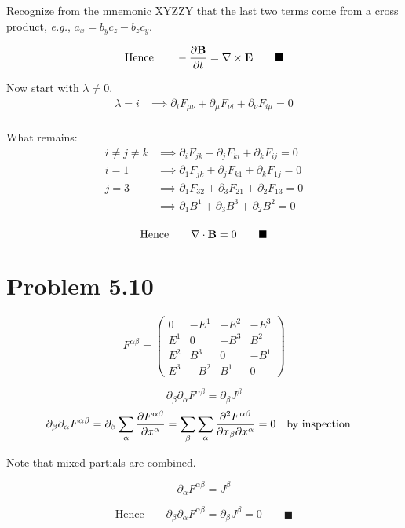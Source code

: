 \documentclass{article}
\begin{document}
Recognize from the mnemonic XYZZY that the last two terms come from a cross product, \emph{e.g.}, $a_x=b_y c_z-b_z c_y$.

 \[\text{Hence}\qquad
-\frac{\partial \vb{B}}{\partial t}= \vb{\nabla} \times \vb{E} 
 \qquad\blacksquare\]

Now start with $\lambda\ne 0$.
\begin{align*} 
\lambda=i&\implies\partial_i F_{\mu \nu} + \partial_\mu F_{\nu i} + \partial_\nu F_{i \mu} = 0 \\
\end{align*}

What remains:
\begin{align*} 
i\ne j\ne k&\implies\partial_i F_{j k} + \partial_j F_{k i} + \partial_k F_{i j} = 0 \\
i=1&\implies\partial_1 F_{j k} + \partial_j F_{k 1} + \partial_k F_{1 j} = 0 \\
j=3&\implies\partial_1 F_{3 2} + \partial_3 F_{2 1} + \partial_2 F_{1 3} = 0 \\
&\implies\partial_1 B^1 + \partial_3 B^3 + \partial_2 B^2 = 0 \\
\end{align*}

 \[\text{Hence}\qquad
 \vb{\nabla} \cdot \vb{B} =0
 \qquad\blacksquare\]
\section*{Problem 5.10}

\[F^{\alpha \beta} = \begin{pmatrix}
  0 & -E^1 & -E^2 & -E^3 \\
  E^1 & 0 & -B^3 & B^2 \\
  E^2 & B^3 & 0 & -B^1  \\
  E^3 & -B^2 & B^1 & 0
 \end{pmatrix}\]

\[\partial_\beta \partial_\alpha F^{\alpha \beta} = \partial_\beta J^\beta\]
\[\partial_\beta \partial_\alpha F^{\alpha \beta} = \partial_\beta\sum_{\alpha} \pdv{F^{\alpha \beta}}{x^\alpha}=\sum_{\beta}\sum_{\alpha} \pdv{F^{\alpha \beta}}{x_{\beta}}{x^\alpha}=0 \qq{by inspection}\]

Note that mixed partials are combined.

\[ \partial_\alpha F^{\alpha \beta} = J^\beta \]

\[\text{Hence}\qquad \partial_\beta \partial_\alpha F^{\alpha \beta} = \partial_\beta J^\beta=0\qquad\blacksquare\]
\end{document}
